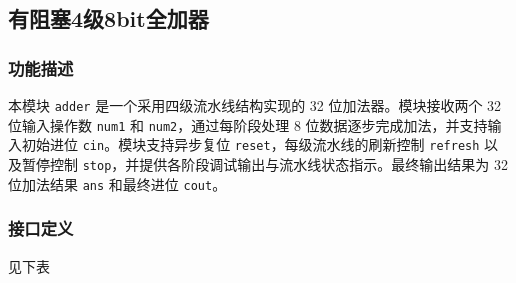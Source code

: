 \subsection{有阻塞4级8bit全加器}\label{sub:ctl}
\subsubsection{功能描述}
本模块 \texttt{adder} 是一个采用四级流水线结构实现的 32 位加法器。模块接收两个 32 位输入操作数 \texttt{num1} 和 \texttt{num2}，通过每阶段处理 8 位数据逐步完成加法，并支持输入初始进位 \texttt{cin}。模块支持异步复位 \texttt{reset}，每级流水线的刷新控制 \texttt{refresh} 以及暂停控制 \texttt{stop}，并提供各阶段调试输出与流水线状态指示。最终输出结果为 32 位加法结果 \texttt{ans} 和最终进位 \texttt{cout}。

\subsubsection{接口定义}
\text{}见下表

